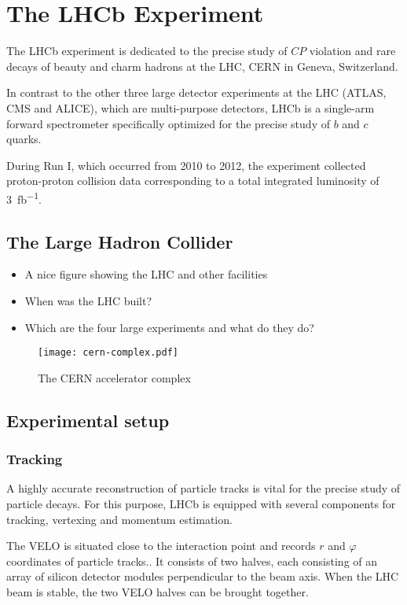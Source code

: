 
\chapter{The LHCb Experiment} %

The LHCb experiment is dedicated to the precise study of $CP$ violation and rare decays of beauty and charm hadrons at the \gls{LHC}, \gls{CERN} in Geneva, Switzerland.

In contrast to the other three large detector experiments at the LHC (ATLAS, CMS and ALICE), which are multi-purpose detectors, LHCb is a single-arm forward spectrometer specifically optimized for the precise study of $b$ and $c$ quarks.

During Run I, which occurred from 2010 to 2012, the experiment collected proton-proton collision data corresponding to a total integrated luminosity of \SI{3}{fb^{-1}}.

\section{The Large Hadron Collider}

\begin{itemize}
  \item A nice figure showing the LHC and other facilities
  \item When was the LHC built?
  \item Which are the four large experiments and what do they do?
\end{itemize}

\begin{figure}
  \centering
  \texttt{[image: cern-complex.pdf]}
  \caption{The CERN accelerator complex}
\end{figure}

\section{Experimental setup}

\subsection{Tracking}

A highly accurate reconstruction of particle tracks is vital for the precise study of particle decays.
For this purpose, LHCb is equipped with several components for tracking, vertexing and momentum estimation.

The \gls{VELO} is situated close to the interaction point and records $r$ and $φ$ coordinates of particle tracks..
It consists of two halves, each consisting of an array of silicon detector modules perpendicular to the beam axis.
When the LHC beam is stable, the two \gls{VELO} halves can be brought together.

